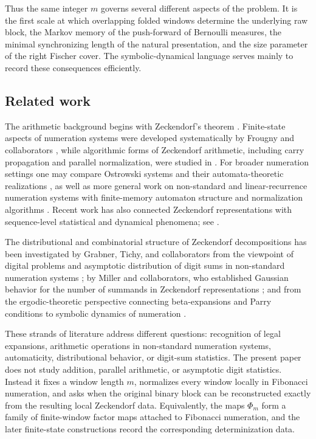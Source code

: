 Thus the same integer $m$ governs several different aspects of the problem.  It
is the first scale at which overlapping folded windows determine the
underlying raw block, the Markov memory of the push-forward of Bernoulli
measures, the minimal synchronizing length of the natural presentation, and
the size parameter of the right Fischer cover.  The symbolic-dynamical
language serves mainly to record these consequences efficiently.

\subsection*{Related work}

The arithmetic background begins with Zeckendorf's theorem
\cite{Zeckendorf1972}.  Finite-state aspects of numeration systems were
developed systematically by Frougny and collaborators
\cite{Frougny1991FibonacciFiniteAutomata,Frougny1992NumbersAutomata,
Frougny1999OnlineAddition,FrougnySolomyak1992}, while algorithmic forms of
Zeckendorf arithmetic, including carry propagation and parallel normalization,
were studied in \cite{AhlbachUsatineFrougnyPippenger2013}.  For broader
numeration settings one may compare Ostrowski systems and their
automata-theoretic realizations
\cite{Berthe2001Ostrowski,HieronymiTerry2018OstrowskiAddition,
BaranwalaSchaefferShallit2021OstrowskiAutomatic}, as well as more general work
on non-standard and linear-recurrence numeration systems with finite-memory
automaton structure and normalization algorithms
\cite{AlloucheShallit2003AutomaticSequences,
FrougnyPelantovaSvobodova2013MinimalDigitSets,
Frougny2012NumbersAsStreamsLeiden,LegerskySvobodova2018EWM}.  Recent work has
also connected Zeckendorf representations with sequence-level statistical and
dynamical phenomena; see \cite{ManiboMiroRustTadeo2020ZeckendorfMixing}.

The distributional and combinatorial structure of Zeckendorf decompositions has
been investigated by Grabner, Tichy, and collaborators from the viewpoint of
digital problems and asymptotic distribution of digit sums in non-standard
numeration systems \cite{GrabnerTichy1995FibonacciDigitalSums}; by Miller and
collaborators, who established Gaussian behavior for the number of summands in
Zeckendorf representations \cite{MillerWang2012GaussianZeckendorf}; and from the
ergodic-theoretic perspective connecting beta-expansions and Parry conditions to
symbolic dynamics of numeration \cite{Parry1960BetaExpansions,
Renyi1957Representations}.

These strands of literature address different questions: recognition of legal
expansions, arithmetic operations in non-standard numeration systems,
automaticity, distributional behavior, or digit-sum statistics.  The present
paper does not study addition, parallel arithmetic, or asymptotic digit
statistics.  Instead it fixes a window length $m$, normalizes every window
locally in Fibonacci numeration, and asks when the original binary block can be
reconstructed exactly from the resulting local Zeckendorf data.  Equivalently,
the maps $\Phi_m$ form a family of finite-window factor maps attached to
Fibonacci numeration, and the later finite-state constructions record the
corresponding determinization data.

